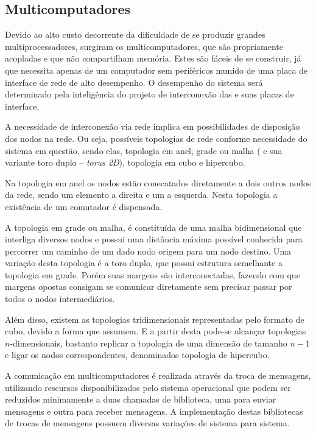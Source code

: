 \subsection{Multicomputadores}
\label{subsec:multicomputadores}

Devido ao alto custo decorrente da dificuldade de se produzir grandes multiprocessadores, surgiram os multicomputadores, que são \cpus propriamente acopladas e que não compartilham memória. Estes são fáceis de se construir, já que necessita apenas de um computador sem periféricos munido de uma placa de interface de rede de alto desempenho. O desempenho do sistema será determinado pela inteligência do projeto de interconexão das \cpus e suas placas de interface.

A necessidade de interconexão via rede implica em possibilidades de disposição dos nodos na rede. Ou seja, possíveis topologias de rede conforme necessidade do sistema em questão, sendo elas, topologia em anel, grade ou malha ( e sua variante toro duplo -- \textit{torus 2D}), topologia em cubo e hipercubo.

Na topologia em anel os nodos estão conecatados diretamente a dois outros nodos da rede, sendo um elemento a direita e um a esquerda. Nesta topologia a existência de um comutador é dispensada.

A topologia em grade ou malha, é constituída de uma malha bidimensional que interliga diversos nodos e possui uma distância máxima possível conhecida para percorrer um caminho de um dado nodo origem para um nodo destino. Uma variação desta topologia é a toro duplo, que possui estrutura semelhante a topologia em grade. Porém suas margens são interconectadas, fazendo com que margens opostas consigam se comunicar diretamente sem precisar passar por todos o nodos intermediários.

Além disso, existem as topologias tridimensionais representadas pelo formato de cubo, devido a forma que assumem. E a partir desta pode-se alcançar topologias $n$-dimensionais, bastanto replicar a topologia de uma dimensão de tamanho $n-1$ e ligar os nodos correspondentes, denominados topologia de hipercubo.

A comunicação em multicomputadores é realizada através da troca de mensagens, utilizando rescursos disponibilizados pelo sistema operacional que podem ser reduzidos minimamente a duas chamadas de biblioteca, uma para enviar mensagens e outra para receber mensagens. A implementação destas bibliotecas de trocas de mensagens possuem diversas variações de sistema para sistema. 

